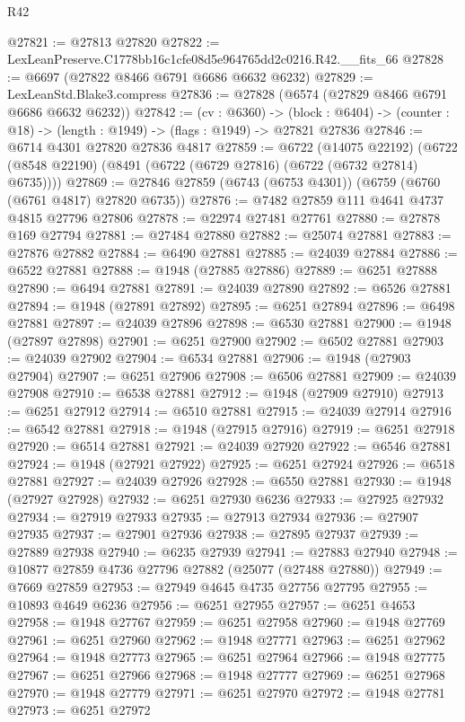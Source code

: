 \begin{lexlean}{R42}
\begin{coremodule}
{@27821 := @27813 @27820
@27822 := LexLeanPreserve.C1778bb16c1cfe08d5e964765dd2c0216.R42.__fits_66
@27828 := @6697 (@27822 @8466 @6791 @6686 @6632 @6232)
@27829 := LexLeanStd.Blake3.compress
@27836 := @27828 (@6574 (@27829 @8466 @6791 @6686 @6632 @6232))
@27842 := (cv : @6360) ->
  (block : @6404) -> (counter : @18) -> (length : @1949) -> (flags : @1949) -> @27821 @27836
@27846 := @6714 @4301 @27820 @27836 @4817
@27859 := @6722
    (@14075 @22192)
    (@6722 (@8548 @22190) (@8491 (@6722 (@6729 @27816) (@6722 (@6732 @27814) @6735))))
@27869 := @27846 @27859 (@6743 (@6753 @4301)) (@6759 (@6760 (@6761 @4817) @27820 @6735))
@27876 := @7482 @27859 @111 @4641 @4737 @4815 @27796 @27806
@27878 := @22974 @27481 @27761
@27880 := @27878 @169 @27794
@27881 := @27484 @27880
@27882 := @25074 @27881
@27883 := @27876 @27882
@27884 := @6490 @27881
@27885 := @24039 @27884
@27886 := @6522 @27881
@27888 := @1948 (@27885 @27886)
@27889 := @6251 @27888
@27890 := @6494 @27881
@27891 := @24039 @27890
@27892 := @6526 @27881
@27894 := @1948 (@27891 @27892)
@27895 := @6251 @27894
@27896 := @6498 @27881
@27897 := @24039 @27896
@27898 := @6530 @27881
@27900 := @1948 (@27897 @27898)
@27901 := @6251 @27900
@27902 := @6502 @27881
@27903 := @24039 @27902
@27904 := @6534 @27881
@27906 := @1948 (@27903 @27904)
@27907 := @6251 @27906
@27908 := @6506 @27881
@27909 := @24039 @27908
@27910 := @6538 @27881
@27912 := @1948 (@27909 @27910)
@27913 := @6251 @27912
@27914 := @6510 @27881
@27915 := @24039 @27914
@27916 := @6542 @27881
@27918 := @1948 (@27915 @27916)
@27919 := @6251 @27918
@27920 := @6514 @27881
@27921 := @24039 @27920
@27922 := @6546 @27881
@27924 := @1948 (@27921 @27922)
@27925 := @6251 @27924
@27926 := @6518 @27881
@27927 := @24039 @27926
@27928 := @6550 @27881
@27930 := @1948 (@27927 @27928)
@27932 := @6251 @27930 @6236
@27933 := @27925 @27932
@27934 := @27919 @27933
@27935 := @27913 @27934
@27936 := @27907 @27935
@27937 := @27901 @27936
@27938 := @27895 @27937
@27939 := @27889 @27938
@27940 := @6235 @27939
@27941 := @27883 @27940
@27948 := @10877 @27859 @4736 @27796 @27882 (@25077 (@27488 @27880))
@27949 := @7669 @27859
@27953 := @27949 @4645 @4735 @27756 @27795
@27955 := @10893 @4649 @6236
@27956 := @6251 @27955
@27957 := @6251 @4653
@27958 := @1948 @27767
@27959 := @6251 @27958
@27960 := @1948 @27769
@27961 := @6251 @27960
@27962 := @1948 @27771
@27963 := @6251 @27962
@27964 := @1948 @27773
@27965 := @6251 @27964
@27966 := @1948 @27775
@27967 := @6251 @27966
@27968 := @1948 @27777
@27969 := @6251 @27968
@27970 := @1948 @27779
@27971 := @6251 @27970
@27972 := @1948 @27781
@27973 := @6251 @27972
}
\end{coremodule}
\end{lexlean}
